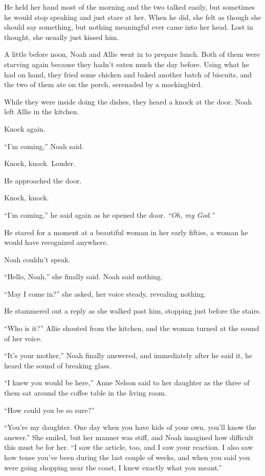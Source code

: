 \documentclass[10pt, twoside, openright]{book}
\begin{document}
He held her hand most of the morning and the two talked easily, but
sometimes he would stop speaking and just stare at her. When he did, she
felt as though she should say something, but nothing meaningful ever
came into her head. Lost in thought, she usually just kissed him.

A little before noon, Noah and Allie went in to prepare lunch. Both of
them were starving again because they hadn't eaten much the day before.
Using what he had on hand, they fried some chicken and baked another
batch of biscuits, and the two of them ate on the porch, serenaded by a
mockingbird.

While they were inside doing the dishes, they heard a knock at the door.
Noah left Allie in the kitchen.


Knock again.

``I'm coming,'' Noah said.

Knock, knock. Louder.

He approached the door.

Knock, knock.

``I'm coming,'' he said again as he opened the door. \emph{``Oh, my
God.''}


He stared for a moment at a beautiful woman in her early fifties, a
woman he would have recognized anywhere.


Noah couldn't speak.

``Hello, Noah,'' she finally said. Noah said nothing.

``May I come in?'' she asked, her voice steady, revealing nothing.


He stammered out a reply as she walked past him, stopping just before
the stairs.

``Who is it?'' Allie shouted from the kitchen, and the woman turned at
the sound of her voice.

``It's your mother,'' Noah finally answered, and immediately after he
said it, he heard the sound of breaking glass.

``I knew you would be here,'' Anne Nelson said to her daughter as the
three of them sat around the coffee table in the living room.


``How could you be so sure?''


``You're my daughter. One day when you have kids of your own, you'll
know the answer.'' She smiled, but her manner was stiff, and Noah
imagined how difficult this must be for her. ``I saw the article, too,
and I saw your reaction. I also saw how tense you've been during the
last couple of weeks, and when you said you were going shopping near the
coast, I knew exactly what you meant.''
\end{document}
